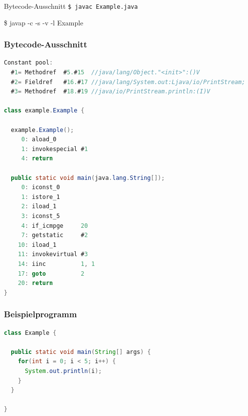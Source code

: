 \documentclass[10pt]{beamer}
\begin{document}
\begin{frame}{Bytecode-Ausschnitt}
\tt{\$ javac Example.java}\pause

{\btt\$ javap -c -s -v -l Example}
\end{frame}


\begin{frame}
\frametitle{Bytecode-Ausschnitt}
\begin{lstlisting}[language=Java]
Constant pool:
  #1= Methodref  #5.#15  //java/lang/Object."<init>":()V
  #2= Fieldref   #16.#17 //java/lang/System.out:Ljava/io/PrintStream;
  #3= Methodref  #18.#19 //java/io/PrintStream.println:(I)V

class example.Example {

  example.Example();
     0: aload_0       
     1: invokespecial #1
     4: return    

  public static void main(java.lang.String[]);
     0: iconst_0      
     1: istore_1      
     2: iload_1       
     3: iconst_5      
     4: if_icmpge     20
     7: getstatic     #2
    10: iload_1       
    11: invokevirtual #3
    14: iinc          1, 1
    17: goto          2
    20: return        
}
\end{lstlisting}
\end{frame}


\begin{frame}[fragile]
\frametitle{Beispielprogramm}
\begin{lstlisting}[language=Java]
class Example {
  
  public static void main(String[] args) {
    for(int i = 0; i < 5; i++) {
      System.out.println(i);
    }
  }

}
\end{lstlisting}
\end{frame}

\end{document}
